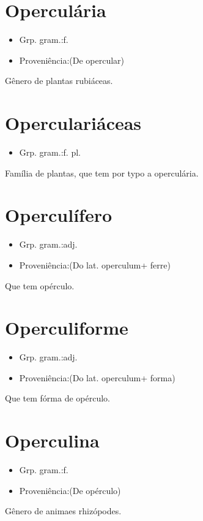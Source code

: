 \section{Operculária}
\begin{itemize}
\item {Grp. gram.:f.}
\end{itemize}
\begin{itemize}
\item {Proveniência:(De \textunderscore opercular\textunderscore )}
\end{itemize}
Gênero de plantas rubiáceas.
\section{Operculariáceas}
\begin{itemize}
\item {Grp. gram.:f. pl.}
\end{itemize}
Família de plantas, que tem por typo a operculária.
\section{Operculífero}
\begin{itemize}
\item {Grp. gram.:adj.}
\end{itemize}
\begin{itemize}
\item {Proveniência:(Do lat. \textunderscore operculum\textunderscore  + \textunderscore ferre\textunderscore )}
\end{itemize}
Que tem opérculo.
\section{Operculiforme}
\begin{itemize}
\item {Grp. gram.:adj.}
\end{itemize}
\begin{itemize}
\item {Proveniência:(Do lat. \textunderscore operculum\textunderscore  + \textunderscore forma\textunderscore )}
\end{itemize}
Que tem fórma de opérculo.
\section{Operculina}
\begin{itemize}
\item {Grp. gram.:f.}
\end{itemize}
\begin{itemize}
\item {Proveniência:(De \textunderscore opérculo\textunderscore )}
\end{itemize}
Gênero de animaes rhizópodes.
